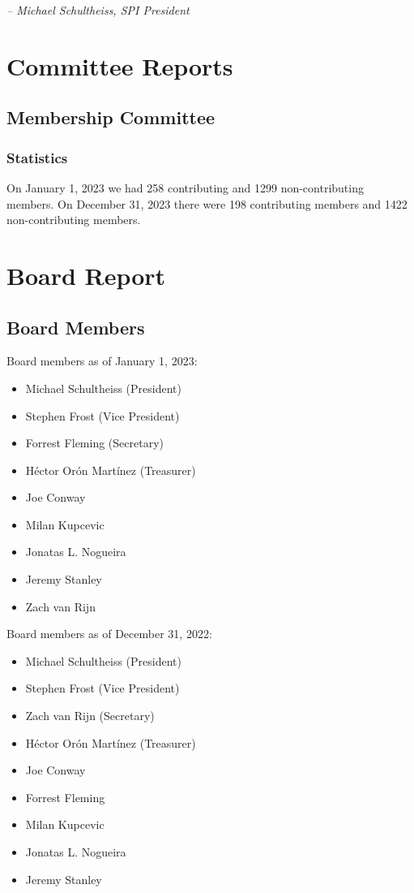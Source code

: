 \documentclass[a4paper]{report}
\begin{document}
  \emph{-- Michael Schultheiss, SPI President}

\newpage

\tableofcontents

\newpage

\chapter{Committee Reports}
\section{Membership Committee}

\subsection{Statistics}

On January 1, 2023 we had 258 contributing and 1299 non-contributing members.  On December 31, 2023 there were 198 contributing members and 1422 non-contributing members.

\chapter{Board Report}
\section{Board Members}

Board members as of January 1, 2023:

\begin{itemize}
\item Michael Schultheiss (President)
\item Stephen Frost (Vice President)
\item Forrest Fleming (Secretary)
\item Héctor Orón Martínez (Treasurer)
\item Joe Conway
\item Milan Kupcevic
\item Jonatas L. Nogueira
\item Jeremy Stanley
\item Zach van Rijn
\end{itemize}

Board members as of December 31, 2022:

\begin{itemize}
\item Michael Schultheiss (President)
\item Stephen Frost (Vice President)
\item Zach van Rijn (Secretary)
\item Héctor Orón Martínez (Treasurer)
\item Joe Conway
\item Forrest Fleming
\item Milan Kupcevic
\item Jonatas L. Nogueira
\item Jeremy Stanley
\end{itemize}
\end{document}
